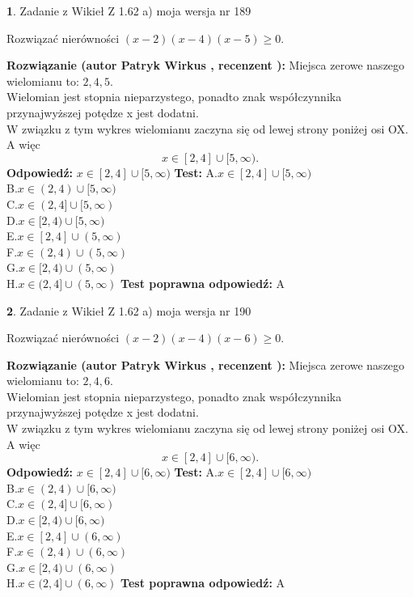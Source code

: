 \documentclass[12pt, a4paper]{article}
\theoremstyle{definition} %
\newtheorem{zad}{}
\newcommand{\zadStart}[1]{\begin{zad}#1\newline}
\newcommand{\zadStop}{\end{zad}}
\newcommand{\rozwStart}[2]{\noindent \textbf{Rozwiązanie (autor #1 , recenzent #2): }\newline}
\newcommand{\rozwStop}{\newline}
\newcommand{\odpStart}{\noindent \textbf{Odpowiedź:}\newline}
\newcommand{\odpStop}{\newline}
\newcommand{\testStart}{\noindent \textbf{Test:}\newline}
\newcommand{\testStop}{\newline}
\newcommand{\kluczStart}{\noindent \textbf{Test poprawna odpowiedź:}\newline}
\newcommand{\kluczStop}{\newline}
\begin{document}
\zadStart{Zadanie z Wikieł Z 1.62 a) moja wersja nr 189}

Rozwiązać nierówności $(x-2)(x-4)(x-5)\ge0$.
\zadStop
\rozwStart{Patryk Wirkus}{}
Miejsca zerowe naszego wielomianu to: $2, 4, 5$.\\
Wielomian jest stopnia nieparzystego, ponadto znak współczynnika przy\linebreak najwyższej potędze x jest dodatni.\\ W związku z tym wykres wielomianu zaczyna się od lewej strony poniżej osi OX. A więc $$x \in [2,4] \cup [5,\infty).$$
\rozwStop
\odpStart
$x \in [2,4] \cup [5,\infty)$
\odpStop
\testStart
A.$x \in [2,4] \cup [5,\infty)$\\
B.$x \in (2,4) \cup [5,\infty)$\\
C.$x \in (2,4] \cup [5,\infty)$\\
D.$x \in [2,4) \cup [5,\infty)$\\
E.$x \in [2,4] \cup (5,\infty)$\\
F.$x \in (2,4) \cup (5,\infty)$\\
G.$x \in [2,4) \cup (5,\infty)$\\
H.$x \in (2,4] \cup (5,\infty)$
\testStop
\kluczStart
A
\kluczStop



\zadStart{Zadanie z Wikieł Z 1.62 a) moja wersja nr 190}

Rozwiązać nierówności $(x-2)(x-4)(x-6)\ge0$.
\zadStop
\rozwStart{Patryk Wirkus}{}
Miejsca zerowe naszego wielomianu to: $2, 4, 6$.\\
Wielomian jest stopnia nieparzystego, ponadto znak współczynnika przy\linebreak najwyższej potędze x jest dodatni.\\ W związku z tym wykres wielomianu zaczyna się od lewej strony poniżej osi OX. A więc $$x \in [2,4] \cup [6,\infty).$$
\rozwStop
\odpStart
$x \in [2,4] \cup [6,\infty)$
\odpStop
\testStart
A.$x \in [2,4] \cup [6,\infty)$\\
B.$x \in (2,4) \cup [6,\infty)$\\
C.$x \in (2,4] \cup [6,\infty)$\\
D.$x \in [2,4) \cup [6,\infty)$\\
E.$x \in [2,4] \cup (6,\infty)$\\
F.$x \in (2,4) \cup (6,\infty)$\\
G.$x \in [2,4) \cup (6,\infty)$\\
H.$x \in (2,4] \cup (6,\infty)$
\testStop
\kluczStart
A
\kluczStop
\end{document}
